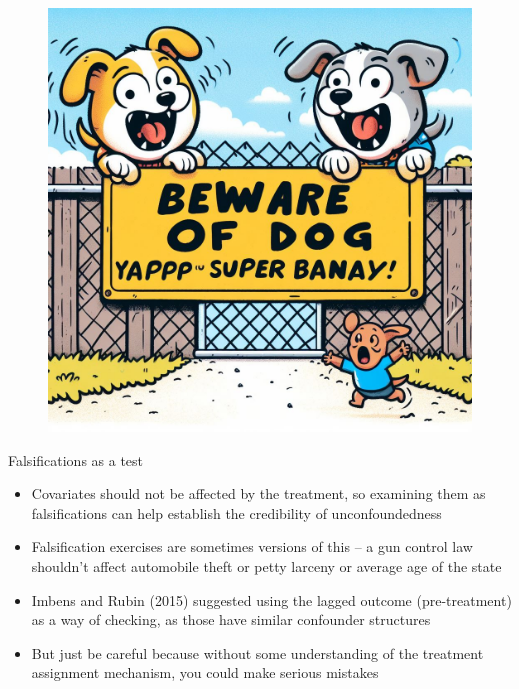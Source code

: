 \documentclass{beamer}
\begin{document}
\begin{frame}
  \begin{figure}
    \includegraphics[scale=0.25]{./lecture_includes/dogs_unconfoundedness}
  \end{figure}
\end{frame}








\begin{frame}{Falsifications as a test}

\begin{itemize}
\item Covariates should not be affected by the treatment, so examining them as falsifications can help establish the credibility of unconfoundedness
\item Falsification exercises are sometimes versions of this -- a gun control law shouldn't affect automobile theft or petty larceny or average age of the state
\item Imbens and Rubin (2015) suggested using the lagged outcome (pre-treatment) as a way of checking, as those have similar confounder structures
\item But just be careful because without some understanding of the treatment assignment mechanism, you could make serious mistakes
\end{itemize}

\end{frame}
\end{document}
